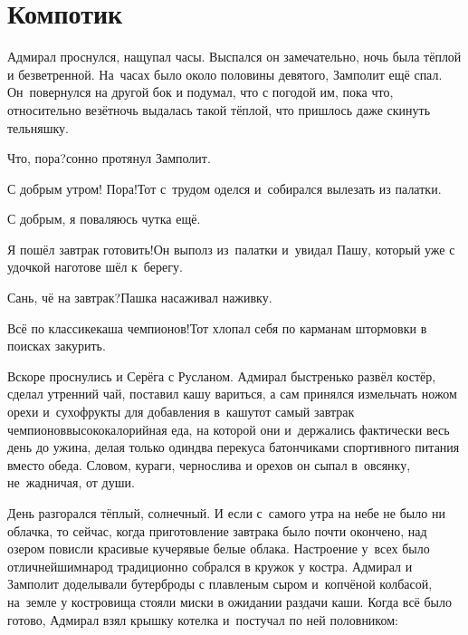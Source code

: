\chapter{Компотик}
\vepsianrose

Адмирал проснулся, нащупал часы. Выспался он замечательно, ночь была тёплой и безветренной. На~часах было около половины девятого, Замполит ещё спал. Он~повернулся на другой бок и подумал, что с погодой им, пока что, относительно везёт\mdash ночь выдалась такой тёплой, что пришлось даже скинуть тельняшку.

\diagdash Что, пора?\mdash сонно протянул Замполит.

\diagdash С добрым утром! Пора!\mdash Тот с~трудом оделся и~собирался вылезать из палатки.

\diagdash С добрым, я поваляюсь чутка ещё.

\diagdash Я пошёл завтрак готовить!\mdash Он выполз из~палатки и~увидал Пашу, который уже с удочкой наготове шёл к~берегу.

\diagdash Сань, чё на завтрак?\mdash Пашка насаживал наживку.

\diagdash Всё по классике\mdash каша чемпионов!\mdash Тот хлопал себя по карманам штормовки в поисках закурить.

Вскоре проснулись и Серёга с Русланом. Адмирал быстренько развёл костёр, сделал утренний чай, поставил кашу вариться, а сам принялся измельчать ножом орехи и~сухофрукты для добавления в~кашу\mdash тот самый завтрак чемпионов\mdash высококалорийная еда, на которой они и~держались фактически весь день до ужина, делая только один\sdash два перекуса батончиками спортивного питания вместо обеда. Словом, кураги, чернослива и орехов он сыпал в~овсянку, не~жадничая, от души.

День разгорался тёплый, солнечный. И если с~самого утра на небе не было ни облачка, то сейчас, когда приготовление завтрака было почти окончено, над озером повисли красивые кучерявые белые облака. Настроение у~всех было отличнейшим\mdash народ традиционно собрался в кружок у костра. Адмирал и Замполит доделывали бутерброды с плавленым сыром и~копчёной колбасой, на~земле у костровища стояли миски в ожидании раздачи каши. Когда всё было готово, Адмирал взял крышку котелка и~постучал по ней половником:

